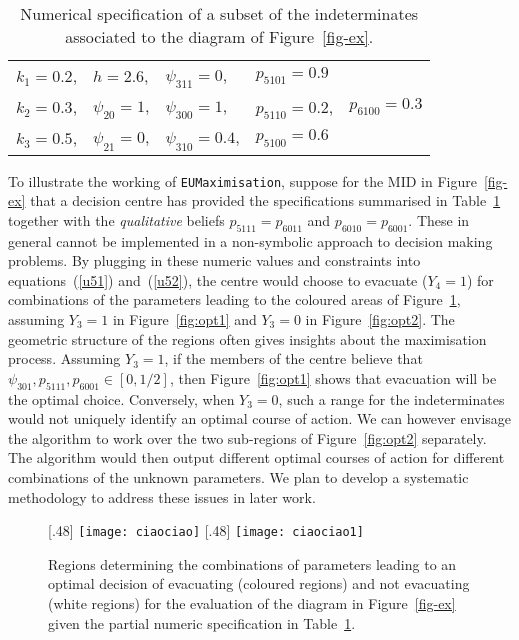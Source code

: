 \begin{table}
\begin{center}
\begin{tabular}{|lllll|}
\hline
$k_1=0.2$,& $h=2.6$,& $\psi_{311} = 0$,& $p_{5101}= 0.9$&\\
$k_2=0.3$,& $\psi_{20} = 1$,& $\psi_{300} = 1$,&$p_{5110}= 0.2$,& $p_{6100}= 0.3$\\ 
$k_3=0.5$,& $\psi_{21}=0$,& $\psi_{310} = 0.4$,& $p_{5100} = 0.6$&\\
\hline
\end{tabular}
\end{center}
\caption{Numerical specification of a subset of the indeterminates associated to the diagram of Figure~\ref{fig-ex}.\label{table:num}}
\end{table}

\begin{example}
To illustrate the working of \texttt{EUMaximisation}, suppose for the  MID in Figure~\ref{fig-ex} that a decision centre has provided the specifications summarised in Table~\ref{table:num} together with the \textit{qualitative} beliefs $p_{5111} = p_{6011}$ and $p_{6010}=p_{6001}$. These in general cannot be implemented in a non-symbolic approach to decision making problems.
By plugging in these numeric values and constraints into equations~(\ref{u51}) and~(\ref{u52}), the centre would choose to evacuate ($Y_4=1$) for combinations of the parameters leading to the coloured areas of Figure~\ref{fig:opt}, assuming $Y_3=1$ in Figure~\ref{fig:opt1} and $Y_3=0$ in Figure~\ref{fig:opt2}. The geometric structure of the regions often gives insights about the maximisation process. 
Assuming $Y_3=1$, if the members of the centre believe that $\psi_{301},p_{5111},p_{6001}\in[0,1/2]$, then Figure~\ref{fig:opt1} shows that evacuation will be the optimal choice. Conversely, when $Y_3=0$, such a range for the indeterminates would not uniquely identify an optimal course of action. We can however envisage the algorithm to work over the two sub-regions of Figure~\ref{fig:opt2} separately. The algorithm would then output different optimal courses of action for different combinations of the unknown parameters. We plan to develop a systematic methodology to address these issues in later work.
\end{example}


\begin{figure}
\begin{center}
[.48\linewidth]{
\texttt{[image: ciaociao]}}
[.48\linewidth]{
\texttt{[image: ciaociao1]}}
\end{center}
\caption{Regions determining the combinations of parameters leading to an optimal decision of evacuating (coloured regions) and not evacuating (white regions) for the evaluation of the diagram in Figure~\ref{fig-ex} given the partial numeric specification in Table~\ref{table:num}. \label{fig:opt}}
\end{figure}

